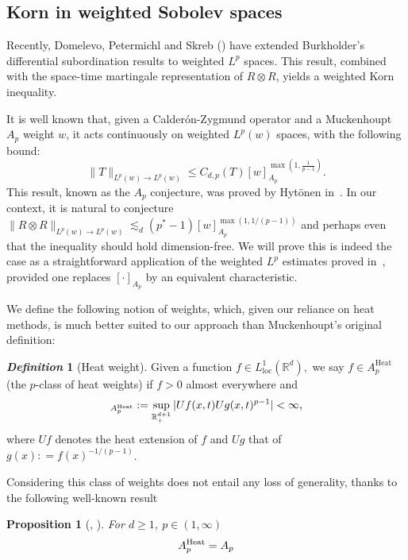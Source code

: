 \documentclass[11pt, a4paper]{amsart}
\newtheorem{proposition}{Proposition}[section]
\theoremstyle{definition}
\newtheorem{definition}{\textsl{Definition}}
\theoremstyle{remark}
\newcommand{\R}{\mathbb{R}}
\begin{document}
\subsection{Korn in weighted Sobolev spaces}
Recently, Domelevo, Petermichl and
Skreb (\cite{Petermichl}) have 
extended Burkholder's differential subordination results
to weighted $L^p$ spaces.
This result, combined
with the space-time martingale
representation of $R\otimes R$,
yields a weighted Korn inequality.\par 
It is well known that, given a Calderón-Zygmund operator
and a Muckenhoupt $A_p$ weight $w$, it acts continuously
on weighted $L^p(w)$ spaces,
with the following bound:
\begin{equation*}
    \|T\|_{L^p(w)\to L^p(w)}
    \le C_{d,p}(T)[w]_{A_p}^{\max(1,\frac1{p-1})}.
\end{equation*}
This result, known as the $A_p$ conjecture,
was proved by Hytönen in~\cite{Hytonen2}. In our context, it is 
natural to conjecture $\|R\otimes R\|_{L^p(w)\to L^p(w)}
\lesssim_d (p^*-1)[w]_{A_p}^{\max(1,1/(p-1))}
$ and perhaps even that the inequality
should hold dimension-free.
We will prove this is indeed the case as a straightforward
application of the weighted $L^p$ estimates
proved in~\cite{Petermichl},
provided one replaces $[\cdot]_{A_p}$ by
an equivalent characteristic.\par
We define the following notion of weights,
which, given our
reliance on heat methods,
is much better suited to our approach
than Muckenhoupt's original definition:
\begin{definition}[Heat weight]
Given a function $f\in L^1_{\mathrm{loc}}(\R^d), $ 
we say $f\in  A_p^{\mathrm{Heat}}$ (the $p$-class of heat 
weights) if $f>0$ almost everywhere and 
\begin{equation*}
    [f]_{A^{\text{\upshape Heat}}_p}
    \mathrel{:}=
    \sup_{\R^{d+1}_+}|
    U f(x,t) U g(x,t)^{p-1}|<\infty,
\end{equation*}
where $U f$ denotes the heat extension of $f$
and $U g$ that of $g(x)\mathrel{:}=f(x)^{-1/(p-
1)}$.
\end{definition}
Considering this class of weights does not entail any loss of 
generality, thanks to the following well-known result
\begin{proposition}
    [{\cite[Theorem 3.4]{Fefferman}, 
    \cite[Theorem 3.2]
    {Petermichl2002HEATINGQUASIREGULAR}}]
For $d\ge 1$, $p\in (1,\infty)$
\begin{equation*}
A^{\text{\upshape Heat}}_p= A_p
\end{equation*}
\end{proposition}
\end{document}
